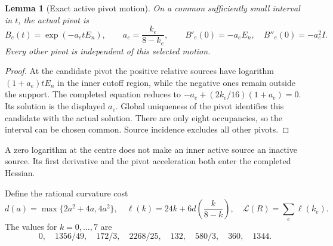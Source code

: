 \documentclass[11pt,oneside,openany]{book}
\newtheorem{lemma}[lemma]{Lemma}
\theoremstyle{definition}
\theoremstyle{remark}
\begin{document}
\begin{lemma}[Exact active pivot motion]
\label{lem:active-pivot-motion}
On a common sufficiently small interval in $t$, the actual pivot is
\[
 B_e(t)=\exp(-a_etE_n),\qquad a_e=\frac{k_e}{8-k_e},
 \qquad B'_e(0)=-a_eE_n,\quad B''_e(0)=-a_e^2I.
\]
Every other pivot is independent of this selected motion.
\end{lemma}
\begin{proof}
At the candidate pivot the positive relative sources have logarithm
$(1+a_e)tE_n$ in the inner cutoff region, while the negative ones
remain outside the support. The completed equation reduces to
$-a_e+(2k_e/16)(1+a_e)=0$. Its solution is the displayed $a_e$.
Global uniqueness of the pivot identifies this candidate with the
actual solution. There are only eight occupancies, so the interval
can be chosen common. Source incidence excludes all other pivots.
\end{proof}
A zero logarithm at the centre does not make an inner active source
an inactive source. Its first derivative and the pivot acceleration
both enter the completed Hessian.

Define the rational curvature cost
\begin{equation}\label{eq:active-debit}
 d(a)=\max\{2a^2+4a,4a^2\},\quad
 \ell(k)=24k+6d\!\left(\frac{k}{8-k}\right),\quad
 \mathcal L(R)=\sum_e\ell(k_e).
\end{equation}
The values for $k=0,\ldots,7$ are
\[
 0,\quad1356/49,\quad172/3,\quad2268/25,\quad132,
                   \quad580/3,\quad360,\quad1344.
\]
\end{document}
